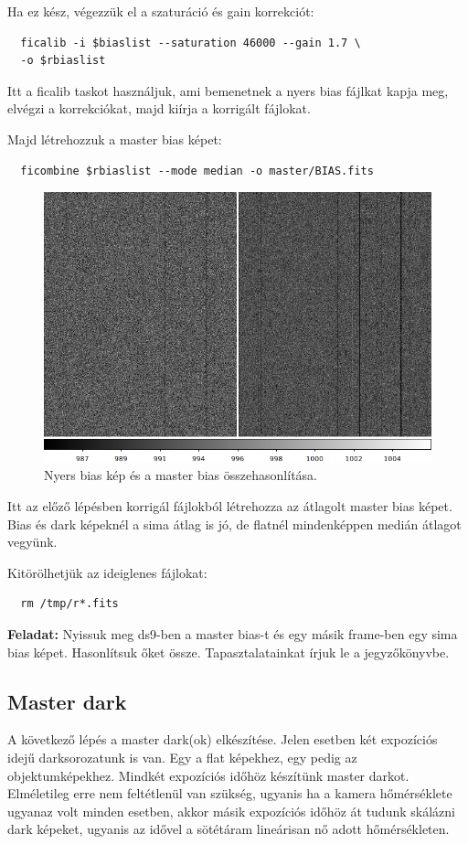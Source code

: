 \documentclass{article}
\begin{document}
Ha ez kész, végezzük el a szaturáció és gain korrekciót:
\begin{verbatim}
  ficalib -i $biaslist --saturation 46000 --gain 1.7 \
  -o $rbiaslist
\end{verbatim}

Itt a ficalib taskot használjuk, ami bemenetnek a nyers bias fájlkat kapja meg,
elvégzi a korrekciókat, majd kiírja a korrigált fájlokat.

Majd létrehozzuk a master bias képet:
\begin{verbatim}
  ficombine $rbiaslist --mode median -o master/BIAS.fits
\end{verbatim}

\begin{figure}[ht!]
    \centering
    \includegraphics[width=0.8\linewidth]{pics/biascomp.png}
    \caption{Nyers bias kép és a master bias összehasonlítása.}
    \label{biascomp}
\end{figure}

Itt az előző lépésben korrigál fájlokból létrehozza az átlagolt master bias
képet. Bias és dark képeknél a sima átlag is jó, de flatnél mindenképpen medián
átlagot vegyünk.

Kitörölhetjük az ideiglenes fájlokat:
\begin{verbatim}
  rm /tmp/r*.fits
\end{verbatim}

{\bf Feladat:}
Nyissuk meg ds9-ben a master bias-t és egy másik frame-ben egy sima bias képet.
Hasonlítsuk őket össze. Tapasztalatainkat írjuk le a jegyzőkönyvbe.


\subsection{Master dark}

A következő lépés a master dark(ok) elkészítése. Jelen esetben két expozíciós
idejű darksorozatunk is van. Egy a flat képekhez, egy pedig az objektumképekhez.
Mindkét expozíciós időhöz készítünk master darkot. Elméletileg erre nem
feltétlenül van szükség, ugyanis ha a kamera hőmérséklete ugyanaz volt minden
esetben, akkor másik expozíciós időhöz át tudunk skálázni dark képeket, ugyanis
az idővel a sötétáram lineárisan nő adott hőmérsékleten.
\end{document}
